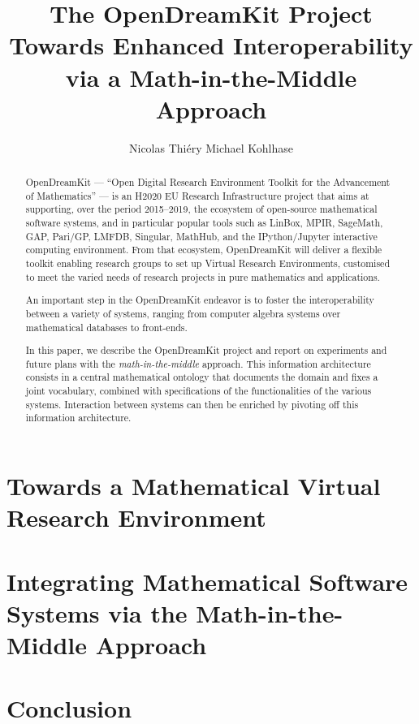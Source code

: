 \documentclass{llncs}
\title{The OpenDreamKit Project\\
  Towards Enhanced Interoperability\\
  via a Math-in-the-Middle Approach}
\author{Nicolas Thi\'ery\inst{1} Michael Kohlhase\inst{2}}
\institute{Universit\'e Paris-Sud, Paris, France\and
Jacobs University, Bremen, Germany}
\begin{document}
\maketitle
\begin{abstract}
  OpenDreamKit --- ``Open Digital Research Environment Toolkit for the
  Advancement of Mathematics'' --- is an H2020 EU Research
  Infrastructure project that aims at supporting, over the period
  2015--2019, the ecosystem of open-source mathematical software
  systems, and in particular popular tools such as LinBox, MPIR,
  SageMath, GAP, Pari/GP, LMFDB, Singular, MathHub, and the
  IPython/Jupyter interactive computing environment. From that
  ecosystem, OpenDreamKit will deliver a flexible toolkit enabling
  research groups to set up Virtual Research Environments, customised
  to meet the varied needs of research projects in pure mathematics
  and applications.

  An important step in the OpenDreamKit endeavor is to foster the
  interoperability between a variety of systems, ranging from computer
  algebra systems over mathematical databases to front-ends.

  In this paper, we describe the OpenDreamKit project and report on experiments and future
  plans with the \emph{math-in-the-middle} approach.  This information architecture
  consists in a central mathematical ontology that documents the domain and fixes a joint
  vocabulary, combined with specifications of the functionalities of the various
  systems. Interaction between systems can then be enriched by pivoting off this
  information architecture.
\end{abstract}

\section{Towards a Mathematical Virtual Research Environment}

\section{Integrating Mathematical Software Systems via the Math-in-the-Middle Approach}
\section{Conclusion}
\end{document}
